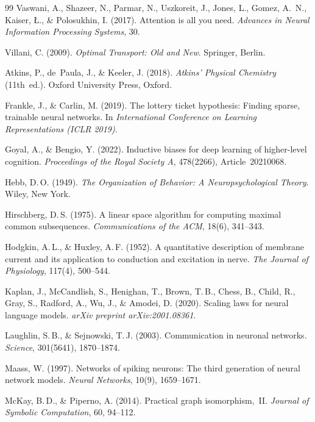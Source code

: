 ﻿\documentclass[12pt, a4paper, openany]{report}
\begin{document}
\begin{thebibliography}{99}
Vaswani, A., Shazeer, N., Parmar, N., Uszkoreit, J., Jones, L., Gomez, A.~N.,
Kaiser, \L., \& Polosukhin, I. (2017).
Attention is all you need.
\textit{Advances in Neural Information Processing Systems}, 30.

Villani, C. (2009).
\textit{Optimal Transport: Old and New}.
Springer, Berlin.


Atkins, P., de~Paula, J., \& Keeler, J. (2018).
\textit{Atkins' Physical Chemistry} (11th~ed.).
Oxford University Press, Oxford.

Frankle, J., \& Carlin, M. (2019).
The lottery ticket hypothesis: Finding sparse, trainable neural networks.
In \textit{International Conference on Learning Representations (ICLR 2019)}.

Goyal, A., \& Bengio, Y. (2022).
Inductive biases for deep learning of higher-level cognition.
\textit{Proceedings of the Royal Society A}, 478(2266), Article~20210068.

Hebb, D.\,O. (1949).
\textit{The Organization of Behavior: A Neuropsychological Theory}.
Wiley, New York.

Hirschberg, D.\,S. (1975).
A linear space algorithm for computing maximal common subsequences.
\textit{Communications of the ACM}, 18(6), 341--343.

Hodgkin, A.\,L., \& Huxley, A.\,F. (1952).
A quantitative description of membrane current and its application to
conduction and excitation in nerve.
\textit{The Journal of Physiology}, 117(4), 500--544.

Kaplan, J., McCandlish, S., Henighan, T., Brown, T.\,B., Chess, B.,
Child, R., Gray, S., Radford, A., Wu, J., \& Amodei, D. (2020).
Scaling laws for neural language models.
\textit{arXiv preprint arXiv:2001.08361}.

Laughlin, S.\,B., \& Sejnowski, T.\,J. (2003).
Communication in neuronal networks.
\textit{Science}, 301(5641), 1870--1874.

Maass, W. (1997).
Networks of spiking neurons: The third generation of neural network models.
\textit{Neural Networks}, 10(9), 1659--1671.

McKay, B.\,D., \& Piperno, A. (2014).
Practical graph isomorphism,~{II}.
\textit{Journal of Symbolic Computation}, 60, 94--112.


\end{thebibliography}
\end{document}
